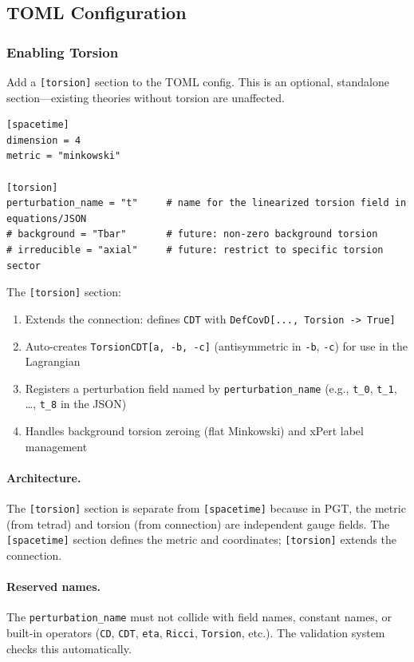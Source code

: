 \subsection{TOML Configuration}
\label{sec:torsion-toml}

\subsubsection{Enabling Torsion}
\label{sec:enabling-torsion}

Add a \texttt{[torsion]} section to the TOML config. This is an optional, standalone section---existing theories without torsion are unaffected.

\begin{lstlisting}[style=toml]
[spacetime]
dimension = 4
metric = "minkowski"

[torsion]
perturbation_name = "t"     # name for the linearized torsion field in equations/JSON
# background = "Tbar"       # future: non-zero background torsion
# irreducible = "axial"     # future: restrict to specific torsion sector
\end{lstlisting}

The \texttt{[torsion]} section:
\begin{enumerate}
  \item Extends the connection: defines \texttt{CDT} with \texttt{DefCovD[..., Torsion -> True]}
  \item Auto-creates \texttt{TorsionCDT[a, -b, -c]} (antisymmetric in \texttt{-b}, \texttt{-c}) for use in the Lagrangian
  \item Registers a perturbation field named by \texttt{perturbation\_name} (e.g., \texttt{t\_0}, \texttt{t\_1}, \ldots, \texttt{t\_8} in the JSON)
  \item Handles background torsion zeroing (flat Minkowski) and xPert label management
\end{enumerate}

\paragraph{Architecture.}
\label{par:torsion-architecture}
The \texttt{[torsion]} section is separate from \texttt{[spacetime]} because in PGT, the metric (from tetrad) and torsion (from connection) are independent gauge fields. The \texttt{[spacetime]} section defines the metric and coordinates; \texttt{[torsion]} extends the connection.

\paragraph{Reserved names.}
\label{par:reserved-names}
The \texttt{perturbation\_name} must not collide with field names, constant names, or built-in operators (\texttt{CD}, \texttt{CDT}, \texttt{eta}, \texttt{Ricci}, \texttt{Torsion}, etc.). The validation system checks this automatically.

